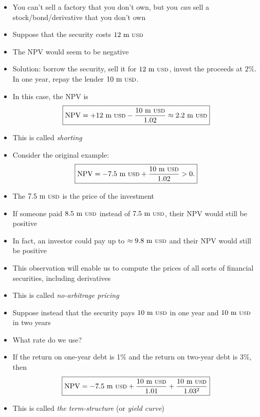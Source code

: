 \documentclass{beamer}
\begin{document}
\begin{frame}{}
	\begin{itemize}
		\item You can't sell a factory that you don't own, but you \textit{can} sell a stock/bond/derivative that you don't own
		\item Suppose that the security costs $12\text{ m {\scriptsize USD}}$
		\item The NPV would seem to be negative
		\item Solution: borrow the security, sell it for $12\text{ m {\scriptsize USD}}$, invest the proceeds at $2\%$. In one year, repay the lender $10\text{ m {\scriptsize USD}}$.
		\item In this case, the NPV is 
		\begin{equation}
			\boxed{
			\text{NPV}=+12\text{ m {\scriptsize USD}}-\frac{10\text{ m {\scriptsize USD}}}{1.02}\approx2.2\text{ m {\scriptsize USD}}
			}
		\end{equation}
		\item This is called \textit{shorting}
	\end{itemize}
\end{frame}

\begin{frame}{}
	\begin{itemize}
	\item Consider the original example:
		\begin{equation}
			\boxed{
			\text{NPV}=-7.5\text{ m {\scriptsize USD}}+\frac{10\text{ m {\scriptsize USD}}}{1.02}>0.
			}
		\end{equation}
	\item The $7.5\text{ m {\scriptsize USD}}$ is the price of the investment
	\item If someone paid $8.5\text{ m {\scriptsize USD}}$ instead of $7.5\text{ m {\scriptsize USD}}$, their NPV would still be positive
	\item In fact, an investor could pay up to $\approx9.8\text{ m {\scriptsize USD}}$ and their NPV would still be positive 
	\item This observation will enable us to compute the prices of all sorts of financial securities, including derivatives
	\item This is called \textit{no-arbitrage pricing}
	\end{itemize}
\end{frame}

\begin{frame}{}
	\begin{itemize}
	\item Suppose instead that the security pays $10\text{ m {\scriptsize USD}}$ in one year and $10\text{ m {\scriptsize USD}}$ in two years
	\item What rate do we use?
	\item If the return on one-year debt is 1\% and the return on two-year debt is 3\%, then 
		\begin{equation}
			\boxed{
			\text{NPV}=-7.5\text{ m {\scriptsize USD}}+\frac{10\text{ m {\scriptsize USD}}}{1.01}+\frac{10\text{ m {\scriptsize USD}}}{1.03^2}
			}
		\end{equation}
	\item This is called \textit{the term-structure} (or \textit{yield curve})
	\end{itemize}
\end{frame}
\end{document}
